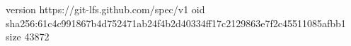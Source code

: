 version https://git-lfs.github.com/spec/v1
oid sha256:61c4c991867b4d752471ab24f4b2d40334ff17c2129863e7f2c45511085afbb1
size 43872
